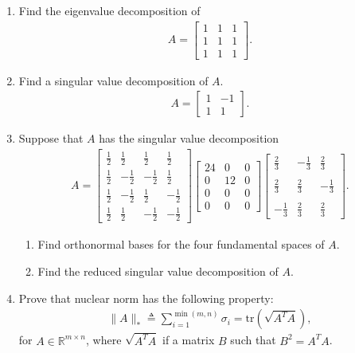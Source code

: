 \documentclass{article}
\begin{document}
\begin{enumerate}
\item Find the eigenvalue decomposition of 
	\begin{align*}
	A=\left[ \begin{array}{lll} 1&1&1\\ 1&1&1\\ 1&1&1\end{array}\right].	
	\end{align*}


\item
Find a singular value decomposition of $A$.
	\begin{align*}
	A=\left[\begin{array}{ll} 1&-1\\ 1&1\end{array}\right].	
	\end{align*}

\newpage
\item
Suppose that $A$ has the singular value decomposition
	\begin{align*}
	A=\left[ \begin{array}{rrrr} \frac{1}{2}	&\frac{1}{2}&\frac{1}{2}&\frac{1}{2} \\ \frac{1}{2}&-\frac{1}{2}&-\frac{1}{2}&\frac{1}{2} \\ \frac{1}{2}&-\frac{1}{2}&\frac{1}{2}&-\frac{1}{2} \\ \frac{1}{2}&\frac{1}{2}&-\frac{1}{2}&-\frac{1}{2}\end{array}\right]\left[\begin{array}{lll} 24&0&0 \\ 0&12&0 \\ 0&0&0 \\ 0&0&0 \end{array}\right] \left[\begin{array}{rrr}\frac{2}{3} &-\frac{1}{3} & \frac{2}{3}\\ \\\frac{2}{3} & \frac{2}{3} & -\frac{1}{3} \\\\ -\frac{1}{3} & \frac{2}{3} & \frac{2}{3}\end{array}\right].
	\end{align*}
\begin{enumerate}
\item Find orthonormal bases for the four fundamental spaces of $A$.

\item Find the reduced singular value decomposition of $A$.

\end{enumerate}

\item Prove that nuclear norm has the following property:
	\begin{align*}
	\|A\|_*\triangleq \sum_{i=1}^{\min(m,n)} \sigma_i=\text{tr}(\sqrt{A^TA}),	
	\end{align*}
for $A\in\mathbb{R}^{m\times n}$, where $\sqrt{A^TA}$ if a matrix $B$ such that $B^2=A^TA$.






\end{enumerate}
\end{document}
